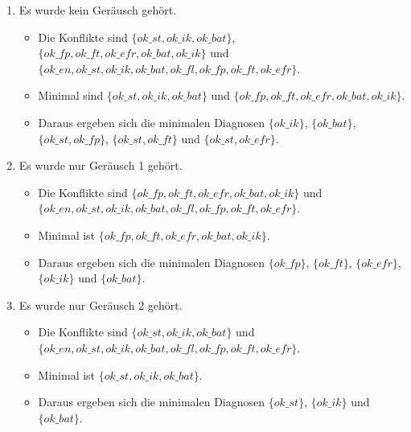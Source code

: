 \documentclass[a4paper]{scrartcl}
\begin{document}
\begin{enumerate}
    \item Es wurde kein Geräusch gehört.
        \begin{itemize}
            \item Die Konflikte sind
                $\{ok\_st, ok\_ik, ok\_bat\}$,
                $\{ok\_fp, ok\_ft, ok\_efr, ok\_bat, ok\_ik\}$ und
                $\{ok\_en, ok\_st, ok\_ik, ok\_bat, ok\_fl,ok\_fp, ok\_ft,
                ok\_efr\}$.
            \item Minimal sind
                $\{ok\_st, ok\_ik, ok\_bat\}$ und
                $\{ok\_fp, ok\_ft, ok\_efr, ok\_bat, ok\_ik\}$.
            \item Daraus ergeben sich die minimalen Diagnosen
                $\{ok\_ik\}$, $\{ok\_bat\}$, $\{ok\_st, ok\_fp\}$, $\{ok\_st,
                ok\_ft\}$ und $\{ok\_st, ok\_efr\}$.
        \end{itemize}

    \item Es wurde nur Geräusch 1 gehört.
        \begin{itemize}
            \item Die Konflikte sind
                $\{ok\_fp, ok\_ft, ok\_efr, ok\_bat, ok\_ik\}$ und \\
                $\{ok\_en, ok\_st, ok\_ik, ok\_bat, ok\_fl,ok\_fp, ok\_ft,
                ok\_efr\}$.
            \item Minimal ist
                $\{ok\_fp, ok\_ft, ok\_efr, ok\_bat, ok\_ik\}$.
            \item Daraus ergeben sich die minimalen Diagnosen
                $\{ok\_fp\}$, $\{ok\_ft\}$, $\{ok\_efr\}$, $\{ok\_ik\}$ und
                $\{ok\_bat\}$.
        \end{itemize}

    \item Es wurde nur Geräusch 2 gehört.
        \begin{itemize}
            \item Die Konflikte sind
                $\{ok\_st, ok\_ik, ok\_bat\}$ und \\
                $\{ok\_en, ok\_st, ok\_ik, ok\_bat, ok\_fl,ok\_fp, ok\_ft,
                ok\_efr\}$.
            \item Minimal ist
                $\{ok\_st, ok\_ik, ok\_bat\}$.
            \item Daraus ergeben sich die minimalen Diagnosen
                $\{ok\_st\}$, $\{ok\_ik\}$ und $\{ok\_bat\}$.
        \end{itemize}


\end{enumerate}
\end{document}
